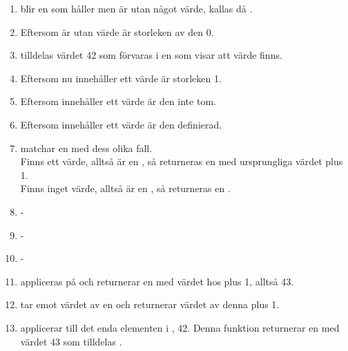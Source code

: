 \SubtaskSolved  \begin{enumerate}
\item {} blir en  som håller  men är utan något värde, kallas då .
\item Eftersom  är utan värde är storleken av den 0.
\item {} tilldelas värdet 42 som förvaras i en  som visar att värde finns.
\item Eftersom  nu innehåller ett värde är storleken 1.
\item Eftersom  innehåller ett värde är den inte tom.
\item Eftersom  innehåller ett värde är den definierad.
\item {} matchar en  med dess olika fall.\\
Finns ett värde, alltså  är en , så returneras en  med ursprungliga värdet plus 1.\\
Finns inget värde, alltså  är en , så returneras en .
\item -
\item -
\item -
\item {} appliceras på  och returnerar en  med värdet hos  plus 1, alltså 43.
\item {} tar emot värdet av en  och returnerar värdet av denna plus 1.
\item {} applicerar  till det enda elementen i , 42. Denna funktion returnerar en  med värdet 43 som tilldelas .
\end{enumerate}

